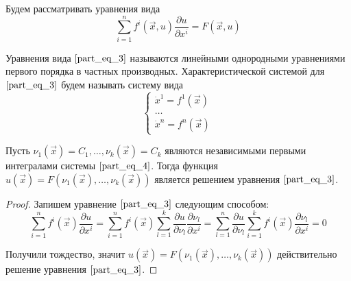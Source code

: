 \documentclass[a4paper, 12pt]{article}
\begin{document}
    Будем рассматривать уравнения вида
    \begin{equation}
        \sum \limits_{i = 1}^{n} f^{i} (\overrightarrow{x}, u) \frac{\partial u}{\partial x^{i}} = F(\overrightarrow{x}, u)
        \label{part_eq_3}
    \end{equation}

    \begin{definition}
        Уравнения вида $\eqref{part_eq_3}$ называются линейными однородными уравнениями первого порядка в частных производных. Характеристической системой для $\eqref{part_eq_3}$ будем называть систему вида
        \begin{equation}
            \begin{cases}
                \dot{x}^1 = f^1(\overrightarrow{x}) \\
                \dots                               \\
                \dot{x}^n = f^n(\overrightarrow{x})
            \end{cases}
            \label{part_eq_4}
        \end{equation}
    \end{definition}

    \begin{theorem}
        Пусть $\nu_1(\overrightarrow{x}) = C_1, \dots, \nu_k(\overrightarrow{x}) = C_k$ являются независимыми первыми интегралами системы $\eqref{part_eq_4}$. Тогда функция $u(\overrightarrow{x}) = F(\nu_1(\overrightarrow{x}), \dots, \nu_k(\overrightarrow{x}))$ является решением уравнения $\eqref{part_eq_3}$.
    \end{theorem}
    \begin{proof}
        Запишем уравнение $\eqref{part_eq_3}$ следующим способом:
        \begin{equation*}
            \sum \limits_{i = 1}^{n} f^{i} (\overrightarrow{x}) \frac{\partial u}{\partial x^{i}} = \sum \limits_{i = 1}^{n} f^{i} (\overrightarrow{x}) \sum \limits_{l = 1}^{k} \frac{\partial u}{\partial \nu_l} \frac{\partial \nu_l}{\partial x^{i}} = \sum \limits_{l = 1}^{n} \frac{\partial u}{\partial \nu_l} \sum \limits_{i = 1}^{k} f^{i} (\overrightarrow{x}) \frac{\partial \nu_l}{\partial x^{i}} = 0
        \end{equation*}

        Получили тождество, значит $u(\overrightarrow{x}) = F(\nu_1(\overrightarrow{x}), \dots, \nu_k(\overrightarrow{x}))$ действительно решение уравнения $\eqref{part_eq_3}$.
    \end{proof}
\end{document}
